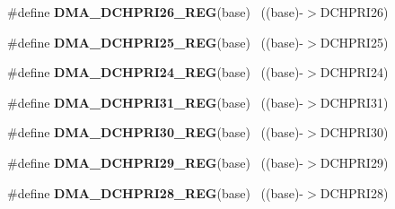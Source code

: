 \begin{DoxyCompactItemize}
\item 
\hypertarget{group___d_m_a___register___accessor___macros_ga0afca82df95790d3abc958d214c862ae}{}\#define {\bfseries D\+M\+A\+\_\+\+D\+C\+H\+P\+R\+I26\+\_\+\+R\+E\+G}(base)                                  ~((base)-\/$>$D\+C\+H\+P\+R\+I26)\label{group___d_m_a___register___accessor___macros_ga0afca82df95790d3abc958d214c862ae}

\item 
\hypertarget{group___d_m_a___register___accessor___macros_gae5d0387925c2eeb9bc6cf424365bed5a}{}\#define {\bfseries D\+M\+A\+\_\+\+D\+C\+H\+P\+R\+I25\+\_\+\+R\+E\+G}(base)                                  ~((base)-\/$>$D\+C\+H\+P\+R\+I25)\label{group___d_m_a___register___accessor___macros_gae5d0387925c2eeb9bc6cf424365bed5a}

\item 
\hypertarget{group___d_m_a___register___accessor___macros_gaba45b8d365af06d6f58021f216efe16b}{}\#define {\bfseries D\+M\+A\+\_\+\+D\+C\+H\+P\+R\+I24\+\_\+\+R\+E\+G}(base)                                  ~((base)-\/$>$D\+C\+H\+P\+R\+I24)\label{group___d_m_a___register___accessor___macros_gaba45b8d365af06d6f58021f216efe16b}

\item 
\hypertarget{group___d_m_a___register___accessor___macros_ga49b38c59c310b87adba2590c5cef6c58}{}\#define {\bfseries D\+M\+A\+\_\+\+D\+C\+H\+P\+R\+I31\+\_\+\+R\+E\+G}(base)                                  ~((base)-\/$>$D\+C\+H\+P\+R\+I31)\label{group___d_m_a___register___accessor___macros_ga49b38c59c310b87adba2590c5cef6c58}

\item 
\hypertarget{group___d_m_a___register___accessor___macros_gac196b76db8cc398a90b729f94ebaef1b}{}\#define {\bfseries D\+M\+A\+\_\+\+D\+C\+H\+P\+R\+I30\+\_\+\+R\+E\+G}(base)                                  ~((base)-\/$>$D\+C\+H\+P\+R\+I30)\label{group___d_m_a___register___accessor___macros_gac196b76db8cc398a90b729f94ebaef1b}

\item 
\hypertarget{group___d_m_a___register___accessor___macros_ga55153219be498d557d4e6ff2e4ff3675}{}\#define {\bfseries D\+M\+A\+\_\+\+D\+C\+H\+P\+R\+I29\+\_\+\+R\+E\+G}(base)                                  ~((base)-\/$>$D\+C\+H\+P\+R\+I29)\label{group___d_m_a___register___accessor___macros_ga55153219be498d557d4e6ff2e4ff3675}

\item 
\hypertarget{group___d_m_a___register___accessor___macros_ga68d3f6230f3cb4af97254ca88ca95d7d}{}\#define {\bfseries D\+M\+A\+\_\+\+D\+C\+H\+P\+R\+I28\+\_\+\+R\+E\+G}(base)                                  ~((base)-\/$>$D\+C\+H\+P\+R\+I28)\label{group___d_m_a___register___accessor___macros_ga68d3f6230f3cb4af97254ca88ca95d7d}


\end{DoxyCompactItemize}
